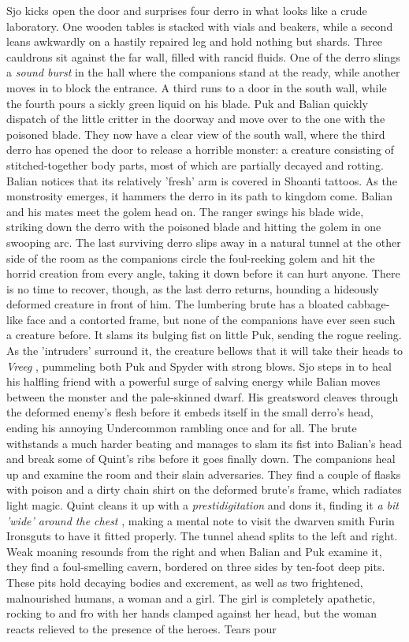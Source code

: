 Sjo kicks open the door and surprises four derro in what looks like a crude laboratory. One wooden tables is stacked with vials and beakers, while a second leans awkwardly on a hastily repaired leg and hold nothing but shards. Three cauldrons sit against the far wall, filled with rancid fluids. One of the derro slings a {\itshape sound burst} in the hall where the companions stand at the ready, while another moves in to block the entrance. A third runs to a door in the south wall, while the fourth pours a sickly green liquid on his blade. Puk and Balian quickly dispatch of the little critter in the doorway and move over to the one with the poisoned blade. They now have a clear view of the south wall, where the third derro has opened the door to release a horrible monster: a creature consisting of stitched-together body parts, most of which are partially decayed and rotting. Balian notices that its relatively 'fresh' arm is covered in Shoanti tattoos. As the monstrosity emerges, it hammers the derro in its path to kingdom come. Balian and his mates meet the golem head on. The ranger swings his blade wide, striking down the derro with the poisoned blade and hitting the golem in one swooping arc. The last surviving derro slips away in a natural tunnel at the other side of the room as the companions circle the foul-reeking golem and hit the horrid creation from every angle, taking it down before it can hurt anyone. There is no time to recover, though, as the last derro returns, hounding a hideously deformed creature in front of him. The lumbering brute has a bloated cabbage-like face and a contorted frame, but none of the companions have ever seen such a creature before. It slams its bulging fist on little Puk, sending the rogue reeling. As the 'intruders' surround it, the creature bellows that it will take their heads to {\itshape Vreeg} , pummeling both Puk and Spyder with strong blows. Sjo steps in to heal his halfling friend with a powerful surge of salving energy while Balian moves between the monster and the pale-skinned dwarf. His greatsword cleaves through the deformed enemy's flesh before it embeds itself in the small derro's head, ending his annoying Undercommon rambling once and for all. The brute withstands a much harder beating and manages to slam its fist into Balian's head and break some of Quint's ribs before it goes finally down. The companions heal up and examine the room and their slain adversaries. They find a couple of flasks with poison and a dirty chain shirt on the deformed brute's frame, which radiates light magic. Quint cleans it up with a {\itshape prestidigitation} and dons it, finding it  {\itshape a bit 'wide' around the chest} , making a mental note to visit the dwarven smith Furin Ironsguts to have it fitted properly. The tunnel ahead splits to the left and right. Weak moaning resounds from the right and when Balian and Puk examine it, they find a foul-smelling cavern, bordered on three sides by ten-foot deep pits. These pits hold decaying bodies and excrement, as well as two frightened, malnourished humans, a woman and a girl. The girl is completely apathetic, rocking to and fro with her hands clamped against her head, but the woman reacts relieved to the presence of the heroes. Tears pour 